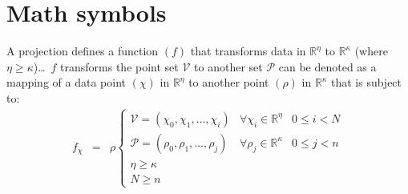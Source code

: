 \documentclass[a4paper,12pt]{article}
\newcommand{\vectorSpace}{\mathds{R}}
\newcommand{\VSet}{\mathcal{V}}
\newcommand{\PSet}{\mathcal{P}}
\begin{document}
	\section*{Math symbols}
	
	A projection defines a function $(f)$ that transforms data in $\vectorSpace^{\eta}$ to $\vectorSpace^{\kappa}$ (where $\eta \geq \kappa$)\dots\ $f$ transforms the point set $\VSet$ to another set $\PSet$ can be denoted as a mapping of a data point $(\chi)$ in $\vectorSpace^{\eta}$ to another point $(\rho)$ in $\vectorSpace^{\kappa}$ that is subject to:
	\begin{eqnarray}
		f_{\chi} & = & \rho \left\{
		\begin{array}{llr}
			\VSet = (\chi_{0}, \chi_{1}, \dots, \chi_{i}) & \forall{\chi_{i}} \in \vectorSpace^{\eta} & 0 \leq i < N \\
			\PSet = (\rho_{0}, \rho_{1}, \dots, \rho_{j}) & \forall{\rho_{j}} \in \vectorSpace^{\kappa} & 0 \leq j < n \\
			\eta \geq \kappa & {} & {} \\
			N \geq n & {} & {}
		\end{array} \right.
	\end{eqnarray}
	
\end{document}
